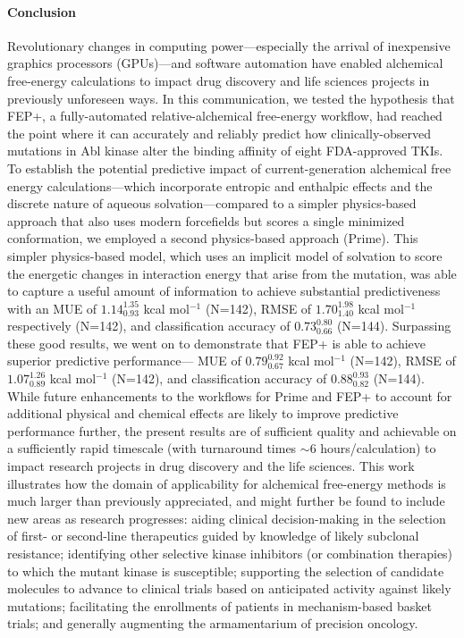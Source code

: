 \documentclass[phd,tocprelim]{cornell}
\begin{document}
%
%
%
%
\paragraph{Conclusion}
Revolutionary changes in computing power---especially the arrival of inexpensive graphics processors (GPUs)---and software automation have enabled alchemical free-energy calculations to impact drug discovery and life sciences projects in previously unforeseen ways.
In this communication, we tested the hypothesis that FEP+, a fully-automated relative-alchemical free-energy workflow,     
had reached the point where it can accurately and reliably predict how clinically-observed mutations in Abl kinase alter the binding affinity of eight FDA-approved TKIs.
To establish the potential predictive impact of current-generation alchemical free energy calculations---which incorporate entropic and enthalpic effects and the discrete nature of aqueous solvation---compared to a simpler physics-based approach that also uses modern forcefields but scores a single minimized conformation, we employed a second physics-based approach (Prime).
This simpler physics-based model, which uses an implicit model of solvation to score the energetic changes in interaction energy that arise from the mutation, was able to capture a useful amount of information to achieve substantial predictiveness with an MUE of $1.14^{1.35}_{0.93}$ kcal mol$^{-1}$ (N=142), RMSE of $1.70^{1.98}_{1.40}$ kcal mol$^{-1}$ respectively (N=142), and classification accuracy of $0.73^{0.80}_{0.66}$ (N=144).
Surpassing these good results, we went on to demonstrate that FEP+ is able to achieve superior predictive performance---
MUE of $0.79^{0.92}_{0.67}$ kcal mol$^{-1}$ (N=142), RMSE of $1.07^{1.26}_{0.89}$ kcal mol$^{-1}$ (N=142), and
classification accuracy of 
$0.88^{0.93}_{0.82}$ (N=144).
While future enhancements to the workflows for Prime and FEP+ to account for additional physical and chemical effects are likely to improve predictive performance further, the present results are of sufficient quality and achievable on a sufficiently rapid timescale (with turnaround times 
$\sim$6 hours/calculation)
to impact research projects in drug discovery and the life sciences.
This work illustrates how the domain of applicability for alchemical free-energy methods is much larger than previously appreciated, and might further be found to include new areas as research progresses: aiding clinical decision-making in the selection of first- or second-line therapeutics guided by knowledge of likely subclonal resistance; identifying other selective kinase inhibitors (or combination therapies) to which the mutant kinase is susceptible; supporting the selection of candidate molecules to advance to clinical trials based on anticipated activity against likely mutations; facilitating the enrollments of patients in mechanism-based basket trials; and generally augmenting the armamentarium of precision oncology.
\end{document}
